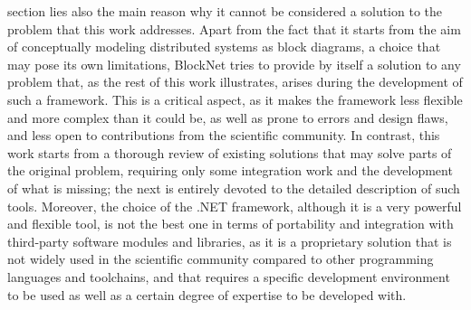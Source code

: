 section lies also the main reason why it cannot be considered a solution to the problem that this work addresses. Apart from the fact that it starts from the aim of conceptually modeling distributed systems as block diagrams, a choice that may pose its own limitations, BlockNet tries to provide by itself a solution to any problem that, as the rest of this work illustrates, arises during the development of such a framework. This is a critical aspect, as it makes the framework less flexible and more complex than it could be, as well as prone to errors and design flaws, and less open to contributions from the scientific community. In contrast, this work starts from a thorough review of existing solutions that may solve parts of the original problem, requiring only some integration work and the development of what is missing; the next  is entirely devoted to the detailed description of such tools. Moreover, the choice of the .NET framework, although it is a very powerful and flexible tool, is not the best one in terms of portability and integration with third-party software modules and libraries, as it is a proprietary solution that is not widely used in the scientific community compared to other programming languages and toolchains, and that requires a specific development environment to be used as well as a certain degree of expertise to be developed with.

